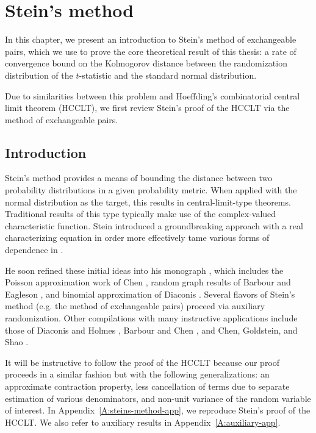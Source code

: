 \chapter{Stein's method}
\label{C:steins-method}
In this chapter, we present an introduction to
Stein's method of exchangeable pairs, which we use to prove the core
theoretical result of this thesis: a rate of convergence bound on the
Kolmogorov distance between the randomization distribution of the $t$-statistic
and the standard normal distribution.

Due to similarities between this problem and Hoeffding's combinatorial central
limit theorem (HCCLT), we first review Stein's proof of the HCCLT via the method
of exchangeable pairs.

\section{Introduction}
\label{S:steins-method-introduction}
Stein's method provides a means
of bounding the distance between two probability distributions in a
given probability metric.  When applied with the normal distribution
as the target, this results in central-limit-type theorems.  Traditional
results of this type typically make use of the complex-valued characteristic
function.  Stein introduced a groundbreaking approach with a real characterizing
equation in order more effectively tame various forms of dependence in
\cite{stein1972bound}.

He soon refined these initial ideas into his monograph
\cite{stein1986approximate}, which includes the Poisson approximation
work of Chen \cite{chen1975poisson}, random graph results of Barbour
and Eagleson \cite{barbour1985multiple}, and binomial approximation of
Diaconis \cite{diaconis1977distribution}.  Several flavors of Stein's
method (e.g. the method of exchangeable pairs) proceed via auxiliary
randomization.  Other compilations with many instructive applications
include those of Diaconis and Holmes \cite{diaconis2004stein}, Barbour
and Chen \cite{barbour2005introduction, barbour2005stein}, and
Chen, Goldstein, and Shao \cite{chen2010normal}.

It will be instructive to follow the proof of the HCCLT
because our proof proceeds in a similar fashion but with the following
generalizations: an approximate contraction property, less
cancellation of terms due to separate estimation of various
denominators, and non-unit variance of the random variable of interest.
In Appendix~\ref{A:steins-method-app}, we reproduce
Stein's \cite{stein1986approximate} proof of the HCCLT.
We also refer to auxiliary results in Appendix~\ref{A:auxiliary-app}.

